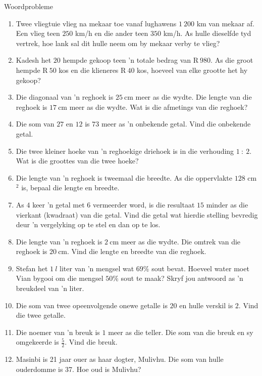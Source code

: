 \begin{exercises}{Woordprobleme}
{
\begin{enumerate}[noitemsep, label=\textbf{\arabic*}. ] 
\item Twee vliegtuie vlieg na mekaar toe vanaf lughawens $1~200$ km van mekaar af. Een vlieg teen $250$ km/h en die ander teen $350$ km/h. As hulle dieselfde tyd vertrek, hoe lank sal dit hulle neem om by mekaar verby te vlieg?
\item Kadesh het $20$ hempde gekoop teen 'n totale bedrag van R$~980$. As die groot hempde R$~50$ kos en die klieneres R$~40$ kos, hoeveel van elke grootte het hy gekoop?
\item Die diagonaal van ’n reghoek is $25~$cm meer as die wydte. Die lengte van die reghoek is $17~$cm meer as die wydte. Wat is die afmetings van die reghoek?  
\item Die som van $27$ en $12$ is $73$ meer as ’n onbekende getal. Vind die onbekende getal.
\item Die twee kleiner hoeke van ’n reghoekige driehoek is in die verhouding $1~:~2$. Wat is die groottes van die
twee hoeke?
\item Die lengte van 'n reghoek is tweemaal die breedte. As die oppervlakte $128$ cm$^{2}$ is, bepaal die lengte en breedte.       
\item As $4$ keer ’n getal met $6$ vermeerder word, is die resultaat $15$ minder as die vierkant (kwadraat) van die
getal. Vind die getal wat hierdie stelling bevredig deur ’n vergelyking op te stel en dan op te los.
\item Die lengte van ’n reghoek is $2~$cm meer as die wydte. Die omtrek van die reghoek is  $20~$cm. Vind die lengte en breedte van die reghoek.
\item Stefan het $1~l$ liter van ’n mengsel wat $69\%$ sout bevat. Hoeveel water moet Vian bygooi om die mengsel $50\%$ sout te maak? Skryf jou antwoord as ’n breukdeel van ’n liter.
\item Die som van twee opeenvolgende onewe getalle is $20$ en hulle verskil is $2$. Vind die twee getalle.
\item Die noemer van 'n breuk is $1$ meer as die teller. Die som van die breuk en sy omgekeerde is $\frac{5}{2}$. Vind die breuk.
\item Masinbi is 21 jaar ouer as haar dogter, Mulivhu. Die som van hulle ouderdomme is 37. Hoe oud is Mulivhu?

\end{enumerate}}
\end{exercises}
